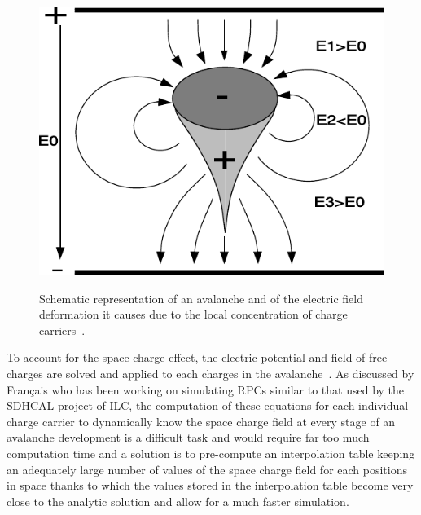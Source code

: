 	\begin{figure}[H]
		\centering
		\includegraphics[width = 0.7\plotwidth]{fig/chapt4/Avalanche_space_charge.pdf}\\
		\caption{\label{fig:Space_charge} Schematic representation of an avalanche and of the electric field deformation it causes due to the local concentration of charge carriers~\cite{LIPPMANN2003}.}
	\end{figure}
	
	To account for the space charge effect, the electric potential and field of free charges are solved and applied to each charges in the avalanche~\cite{LIPPMANN2003,VINCENT2017}. As discussed by Français who has been working on simulating RPCs similar to that used by the SDHCAL project of ILC, the computation of these equations for each individual charge carrier to dynamically know the space charge field at every stage of an avalanche development is a difficult task and would require far too much computation time and a solution is to pre-compute an interpolation table keeping an adequately large number of values of the space charge field for each positions in space thanks to which the values stored in the interpolation table become very close to the analytic solution and allow for a much faster simulation.\\
	
